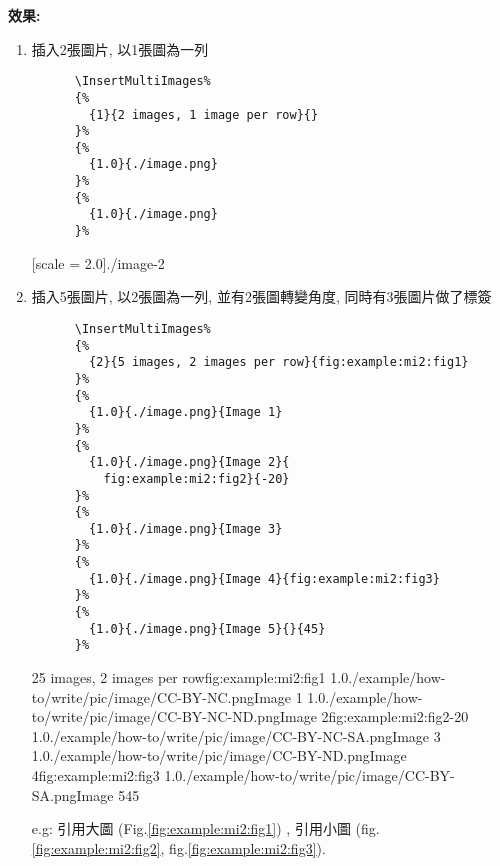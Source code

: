   \newpage

  {\bf 效果:}
  \begin{enumerate}
    \item
    {
      插入2張圖片, 以1張圖為一列
      \begin{verbatim}
      \InsertMultiImages%
      {%
        {1}{2 images, 1 image per row}{}
      }%
      {%
        {1.0}{./image.png}
      }%
      {%
        {1.0}{./image.png}
      }%
      \end{verbatim}
      {
        [scale = 2.0]{./image-2}
      }
    } %

    \newpage

    \item
    {
      插入5張圖片, 以2張圖為一列, 並有2張圖轉變角度, 同時有3張圖片做了標簽
      \begin{verbatim}
      \InsertMultiImages%
      {%
        {2}{5 images, 2 images per row}{fig:example:mi2:fig1}
      }%
      {%
        {1.0}{./image.png}{Image 1}
      }%
      {%
        {1.0}{./image.png}{Image 2}{
          fig:example:mi2:fig2}{-20}
      }%
      {%
        {1.0}{./image.png}{Image 3}
      }%
      {%
        {1.0}{./image.png}{Image 4}{fig:example:mi2:fig3}
      }%
      {%
        {1.0}{./image.png}{Image 5}{}{45}
      }%
      \end{verbatim}
      \InsertMultiImages%
      {%
        {2}{5 images, 2 images per row}{fig:example:mi2:fig1}
      }%
      {%
        {1.0}{./example/how-to/write/pic/image/CC-BY-NC.png}{Image 1}
      }%
      {%
        {1.0}{./example/how-to/write/pic/image/CC-BY-NC-ND.png}{Image 2}{fig:example:mi2:fig2}{-20}
      }%
      {%
        {1.0}{./example/how-to/write/pic/image/CC-BY-NC-SA.png}{Image 3}
      }%
      {%
        {1.0}{./example/how-to/write/pic/image/CC-BY-ND.png}{Image 4}{fig:example:mi2:fig3}
      }%
      {%
        {1.0}{./example/how-to/write/pic/image/CC-BY-SA.png}{Image 5}{}{45}
      }%
    } %

      e.g: 
      引用大圖 (Fig.\ref{fig:example:mi2:fig1}) ,
      引用小圖 (fig.\ref{fig:example:mi2:fig2}, fig.\ref{fig:example:mi2:fig3}).
  \end{enumerate}

\EndChapter
